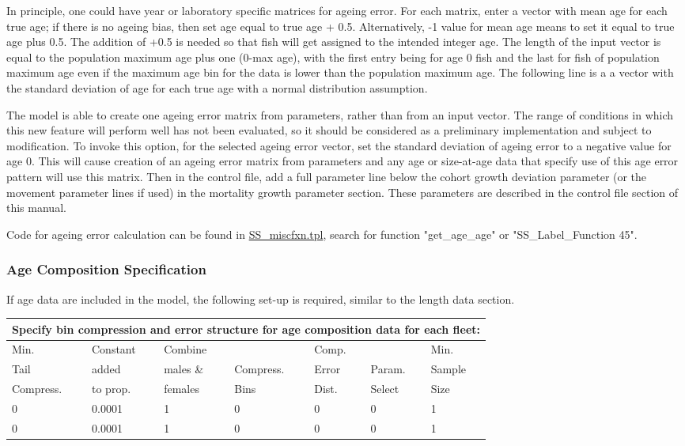 In principle, one could have year or laboratory specific matrices for ageing error. For each matrix, enter a vector with mean age for each true age; if there is no ageing bias, then set age equal to true age + 0.5.  Alternatively, -1 value for mean age means to set it equal to true age plus 0.5.  The addition of +0.5 is needed so that fish will get assigned to the intended integer age. The length of the input vector is equal to the population maximum age plus one (0-max age), with the first entry being for age 0 fish and the last for fish of population maximum age even if the maximum age bin for the data is lower than the population maximum age. The following line is a a vector with the standard deviation of age for each true age with a normal distribution assumption.

The model is able to create one ageing error matrix from parameters, rather than from an input vector.  The range of conditions in which this new feature will perform well has not been evaluated, so it should be considered as a preliminary implementation and subject to modification. To invoke this option, for the selected ageing error vector, set the standard deviation of ageing error to a negative value for age 0.  This will cause creation of an ageing error matrix from parameters and any age or size-at-age data that specify use of this age error pattern will use this matrix. Then in the control file, add a full parameter line below the cohort growth deviation parameter (or the movement parameter lines if used) in the mortality growth parameter section.  These parameters are described in the control file section of this manual.

Code for ageing error calculation can be found in \href{https://github.com/nmfs-stock-synthesis/stock-synthesis/blob/main/SS_miscfxn.tpl}{SS\_miscfxn.tpl}, search for function "get\_age\_age" or "SS\_Label\_Function 45".

\subsubsection{Age Composition Specification}
If age data are included in the model, the following set-up is required, similar to the length data section.

\begin{tabular}{p{2cm} p{2cm} p{2cm} p{1.5cm} p{1.5cm} p{2cm} p{2cm}}
		\multicolumn{7}{l}{Specify bin compression and error structure for age composition data for each fleet:}\\
		\hline
		Min.      & Constant & Combine   &           & Comp. &           & Min.\Tstrut\\
		Tail      & added    & males \&  & Compress. & Error & Param.    & Sample\\
		Compress. & to prop. & females   & Bins      & Dist. & Select    & Size\Bstrut\\
		\hline
		0 & 0.0001 & 1 & 0 & 0 & 0 & 1 \Tstrut\\
		0 & 0.0001 & 1 & 0 & 0 & 0 & 1 \Bstrut\\
		\hline
\end{tabular}

